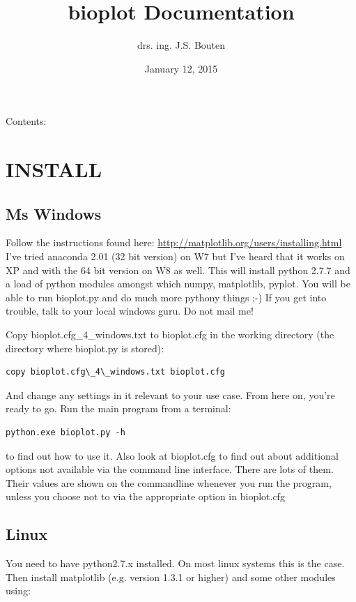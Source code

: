 \documentclass[letterpaper,10pt,english]{sphinxmanual}
\title{bioplot Documentation}
\date{January 12, 2015}
\author{drs. ing. J.S. Bouten}
\begin{document}
\maketitle
\tableofcontents
{}\label{index::doc}


Contents:


\chapter{INSTALL}
\label{install:welcome-to-bioplot-s-documentation}\label{install::doc}\label{install:install}

\section{Ms Windows}
\label{install:ms-windows}
Follow the instructions found here: \href{http://matplotlib.org/users/installing.html}{http://matplotlib.org/users/installing.html}
I've tried anaconda 2.01 (32 bit version) on W7 but I've heard that it works on XP and
with the 64 bit version on W8 as well.
This will install python 2.7.7 and a load of python modules amongst which numpy, matplotlib, pyplot.
You will be able to run bioplot.py and do much more pythony things ;-)
If you get into trouble, talk to your local windows guru. Do not mail me!

Copy bioplot.cfg\_4\_windows.txt to bioplot.cfg in the working directory (the directory where
bioplot.py is stored):

\begin{Verbatim}[commandchars=\\\{\}]
copy bioplot.cfg\_4\_windows.txt bioplot.cfg
\end{Verbatim}

And change any settings in it relevant to your use case.
From here on, you're ready to go. Run the main program from a terminal:

\begin{Verbatim}[commandchars=\\\{\}]
python.exe bioplot.py -h
\end{Verbatim}

to find out how to use it.
Also look at bioplot.cfg to find out about additional options not available
via the command line interface. There are lots of them. Their values are shown on the
commandline whenever you run the program, unless you choose not to via the appropriate
option in bioplot.cfg


\section{Linux}
\label{install:linux}
You need to have python2.7.x installed. On most linux systems this is the case.
Then install matplotlib (e.g. version 1.3.1 or higher) and some other modules using:
\end{document}
